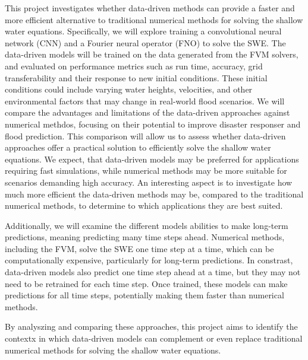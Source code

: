This project investigates whether data-driven methods can provide a faster and more efficient alternative to traditional numerical methods for solving the shallow water equations.
Specifically, we will explore training a convolutional neural network (CNN) and a Fourier neural operator (FNO) to solve the SWE.
The data-driven models will be trained on the data generated from the FVM solvers, and evaluated on performance metrics such as run time, accuracy, grid transferability and their response to new initial conditions.
These initial conditions could include varying water heights, velocities, and other environmental factors that may change in real-world flood scenarios.
We will compare the advantages and limitations of the data-driven approaches against numerical methdos, focusing on their potential to improve disaster responser and flood prediction.%
This comparison will allow us to assess whether data-driven approaches offer a practical solution to efficiently solve the shallow water equations.
We expect, that data-driven models may be preferred for applications requiring fast simulations, while numerical methods may be more suitable for scenarios demanding high accuracy.
An interesting aspect is to investigate how much more efficient the data-driven methods may be, compared to the traditional numerical methods, to determine to which applications they are best suited.

Additionally, we will examine the different models abilities to make long-term predictions, meaning predicting many time steps ahead.
Numerical methods, including the FVM, solve the SWE one time step at a time, which can be computationally expensive, particularly for long-term predictions.
In constrast, data-driven models also predict one time step ahead at a time, but they may not need to be retrained for each time step.
Once trained, these models can make predictions for all time steps, potentially making them faster than numerical methods.

By analyszing and comparing these approaches, this project aims to identify the contextx in which data-driven models can complement or even replace traditional numerical methods for solving the shallow water equations.

